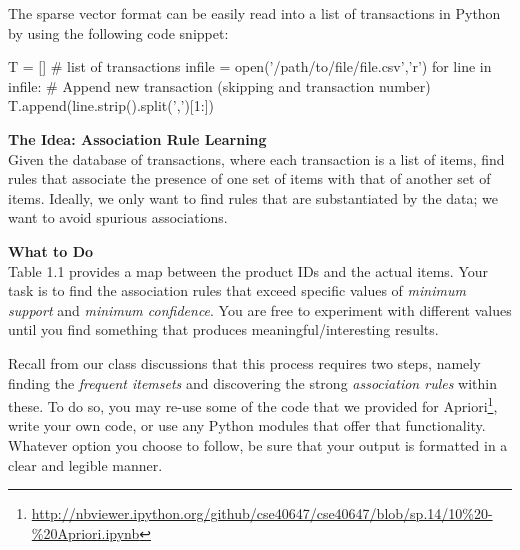 \documentclass[paper=a4, fontsize=11pt]{scrartcl} %
\numberwithin{equation}{section} %
\numberwithin{figure}{section} %
\numberwithin{table}{section} %
\begin{document}
The sparse vector format can be easily read into a list of transactions in Python by using the following code snippet:

\vspace{6pt}

\begin{adjustbox}{minipage=0.8\textwidth,margin=0pt \smallskipamount,center}
\begin{python}
T = [] # list of transactions
infile = open('/path/to/file/file.csv','r')
for line in infile:
      # Append new transaction (skipping \n and transaction number)
      T.append(line.strip().split(',')[1:])
\end{python}
\end{adjustbox}

\vspace{8pt}

\textbf{The Idea:  Association Rule Learning}\\
Given the database of transactions, where each transaction is a list of items, find rules that associate the presence of one set of items with that of another set of items. Ideally, we only want to find rules that are substantiated by the data; we want to avoid spurious associations.

\vspace{8pt}

\textbf{What to Do}\\
Table 1.1 provides a map between the product IDs and the actual items. Your task is to find the association rules that exceed specific values of \textit{minimum support} and \textit{minimum confidence}. You are free to experiment with different values until you find something that produces meaningful/interesting results.

\vspace{6pt}

Recall from our class discussions that this process requires two steps, namely finding the \textit{frequent itemsets} and discovering the strong \textit{association rules} within these. To do so, you may re-use some of the code that we provided for Apriori\footnote{\href{http://nbviewer.ipython.org/github/cse40647/cse40647/blob/sp.14/10\%20-\%20Apriori.ipynb}{http://nbviewer.ipython.org/github/cse40647/cse40647/blob/sp.14/10\%20-\%20Apriori.ipynb}}, write your own code, or use any Python modules that offer that functionality. Whatever option you choose to follow, be sure that your output is formatted in a clear and legible manner.

\vspace{8pt}
\end{document}

